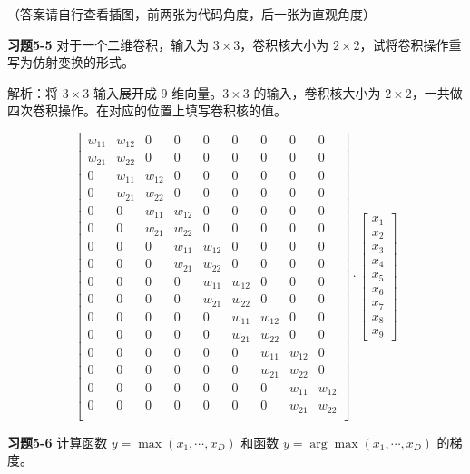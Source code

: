 （答案请自行查看插图，前两张为代码角度，后一张为直观角度）

\noindent\textbf{习题5-5} 对于一个二维卷积，输入为 $3 \times 3$，卷积核大小为 $2 \times 2$，试将卷积操作重写为仿射变换的形式。

解析：将 $3 \times 3$ 输入展开成 9 维向量。$3 \times 3$ 的输入，卷积核大小为 $2 \times 2$，一共做四次卷积操作。在对应的位置上填写卷积核的值。

\[
\begin{bmatrix}
w_{11} & w_{12} & 0 & 0 & 0 & 0 & 0 & 0 & 0 \\
w_{21} & w_{22} & 0 & 0 & 0 & 0 & 0 & 0 & 0 \\
0 & w_{11} & w_{12} & 0 & 0 & 0 & 0 & 0 & 0 \\
0 & w_{21} & w_{22} & 0 & 0 & 0 & 0 & 0 & 0 \\
0 & 0 & w_{11} & w_{12} & 0 & 0 & 0 & 0 & 0 \\
0 & 0 & w_{21} & w_{22} & 0 & 0 & 0 & 0 & 0 \\
0 & 0 & 0 & w_{11} & w_{12} & 0 & 0 & 0 & 0 \\
0 & 0 & 0 & w_{21} & w_{22} & 0 & 0 & 0 & 0 \\
0 & 0 & 0 & 0 & w_{11} & w_{12} & 0 & 0 & 0 \\
0 & 0 & 0 & 0 & w_{21} & w_{22} & 0 & 0 & 0 \\
0 & 0 & 0 & 0 & 0 & w_{11} & w_{12} & 0 & 0 \\
0 & 0 & 0 & 0 & 0 & w_{21} & w_{22} & 0 & 0 \\
0 & 0 & 0 & 0 & 0 & 0 & w_{11} & w_{12} & 0 \\
0 & 0 & 0 & 0 & 0 & 0 & w_{21} & w_{22} & 0 \\
0 & 0 & 0 & 0 & 0 & 0 & 0 & w_{11} & w_{12} \\
0 & 0 & 0 & 0 & 0 & 0 & 0 & w_{21} & w_{22} \\
\end{bmatrix}
\cdot
\begin{bmatrix}
x_1 \\ x_2 \\ x_3 \\ x_4 \\ x_5 \\ x_6 \\ x_7 \\ x_8 \\ x_9
\end{bmatrix}
\]

\noindent\textbf{习题5-6} 计算函数 $y = \max(x_1, \cdots, x_D)$ 和函数 $y = \arg\max(x_1, \cdots, x_D)$ 的梯度。

